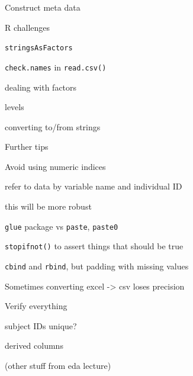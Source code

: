 \documentclass[aspectratio=169,12pt,t]{beamer}
\begin{document}
\begin{frame}[c]{Construct meta data}




\end{frame}





\begin{frame}{R challenges}

  \bbi
\item {\tt stringsAsFactors}
\item {\tt check.names} in {\tt read.csv()}
\item dealing with factors
  \bi
\item levels
\item converting to/from strings
  \ei
  \ei

\end{frame}


\begin{frame}{Further tips}

\bbi
\item Avoid using numeric indices
  \bi
\item refer to data by variable name and individual ID
\item this will be more {\hilit robust}
  \ei
\item {\tt glue} package vs {\tt paste}, {\tt paste0}
\item {\tt stopifnot()} to assert things that should be true
\item {\tt cbind} and {\tt rbind}, but padding with missing values
\item Sometimes converting excel -> csv loses precision
  \ei

  \note{
  }
\end{frame}




\begin{frame}{Verify everything}

\bbi
\item subject IDs unique?
\item derived columns
\item (other stuff from eda lecture)
\ei

  \note{
  }
\end{frame}
\end{document}
